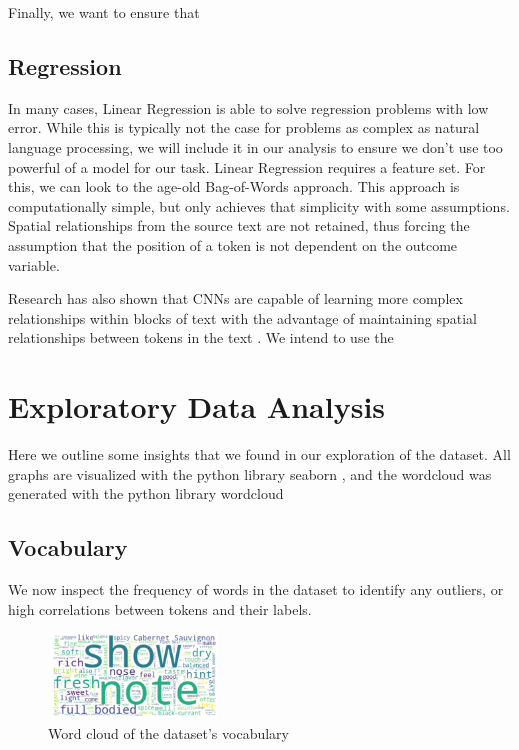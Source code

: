 \documentclass[10pt]{IEEEtran}
\begin{document}
    Finally, we want to ensure that 
    
\subsection{Regression}
    In many cases, Linear Regression is able to solve regression problems with low error. While this is typically not the case for problems as complex as natural language processing, we will include it in our analysis to ensure we don't use too powerful of a model for our task. Linear Regression requires a feature set. For this, we can look to the age-old Bag-of-Words approach\cite{bag_of_words}. This approach is computationally simple, but only achieves that simplicity with some assumptions. Spatial relationships from the source text are not retained, thus forcing the assumption that the position of a token is not dependent on the outcome variable.\par
    Research has also shown that CNNs are capable of learning more complex relationships within blocks of text with the advantage of maintaining spatial relationships between tokens in the text \cite{cnn}. We intend to use the 
    


\section{Exploratory Data Analysis}
    Here we outline some insights that we found in our exploration of the dataset. All graphs are visualized with the python library seaborn \cite{seaborn}, and the wordcloud was generated with the python library wordcloud \cite{wordcloud}

\subsection{Vocabulary}
    We now inspect the frequency of words in the dataset to identify any outliers, or high correlations between tokens and their labels.

    \begin{figure}
    \centering
    \includegraphics[width=0.4\textwidth]{wordcloud}
    \caption{Word cloud of the dataset's vocabulary}
    \end{figure}
\end{document}
